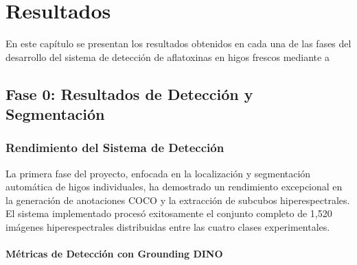 \chapter{Resultados}

En este capítulo se presentan los resultados obtenidos en cada una de las fases del desarrollo del sistema de detección de aflatoxinas en higos frescos mediante a%

\section{Fase 0: Resultados de Detección y Segmentación}

\subsection{Rendimiento del Sistema de Detección}

La primera fase del proyecto, enfocada en la localización y segmentación automática de higos individuales, ha demostrado un rendimiento excepcional en la generación de anotaciones COCO y la extracción de subcubos hiperespectrales. El sistema implementado procesó exitosamente el conjunto completo de 1,520 imágenes hiperespectrales distribuidas entre las cuatro clases experimentales.

\subsubsection{Métricas de Detección con Grounding DINO}

